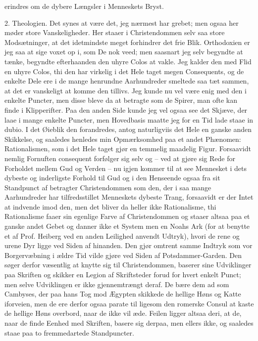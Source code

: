 \documentclass[12pt,a4paper]{article}
\begin{document}
erindres om de dybere Længsler i Menneskets Bryst.

2. Theologien. Det synes at være det, jeg nærmest har grebet; men ogsaa her møder store Vanskeligheder. Her staaer i Christendommen selv saa store Modsætninger, at det idetmindste meget forhindrer det frie Blik. Orthodoxien er jeg saa at sige voxet op i, som De nok veed; men saasnart jeg selv begyndte at tænke, begyndte efterhaanden den uhyre Colos at vakle. Jeg kalder den med Flid en uhyre Colos, thi den har virkelig i det Hele taget megen Consequents, og de enkelte Dele ere i de mange henrundne Aarhundreder smeltede saa tæt sammen, at det er vanskeligt at komme den tillivs. Jeg kunde nu vel være enig med den i enkelte Puncter, men disse bleve da at betragte som de Spirer, man ofte kan finde i Klipperifter. Paa den anden Side kunde jeg vel ogsaa see det Skjæve, der laae i mange enkelte Puncter, men Hovedbasis maatte jeg for en Tid lade staae in dubio. I det Øieblik den forandredes, antog naturligviis det Hele en ganske anden Skikkelse, og saaledes henledes min Opmærksomhed paa et andet Phænomen: Rationalismen, som i det Hele taget gjør en temmelig maadelig Figur. Forsaavidt nemlig Fornuften consequent forfølger sig selv og – ved at gjøre sig Rede for Forholdet mellem Gud og Verden – nu igjen kommer til at see Mennesket i dets dybeste og inderligste Forhold til Gud og i den Henseende ogsaa fra sit Standpunct af betragter Christendommen som den, der i saa mange Aarhundreder har tilfredsstillet Menneskets dybeste Trang, forsaavidt er der Intet at indvende imod den, men det bliver da heller ikke Rationalisme, thi Rationalisme faaer sin egenlige Farve af Christendommen og staaer altsaa paa et ganske andet Gebet og danner ikke et System men en Noahs Ark (for at benytte et af Prof. Heiberg ved en anden Leilighed anvendt Udtryk), hvori de rene og urene Dyr ligge ved Siden af hinanden. Den gjør omtrent samme Indtryk som vor Borgervæbning i ældre Tid vilde gjøre ved Siden af Potsdammer-Garden. Den søger derfor væsentlig at knytte sig til Christendommen, baserer sine Udviklinger paa Skriften og skikker en Legion af Skriftsteder forud for hvert enkelt Punct; men selve Udviklingen er ikke gjennemtrængt deraf. De bære dem ad som Cambyses, der paa hans Tog mod Ægypten skikkede de hellige Høns og Katte iforveien, men de ere derfor ogsaa parate til ligesom den romerske Consul at kaste de hellige Høns overbord, naar de ikke vil æde. Feilen ligger altsaa deri, at de, naar de finde Eenhed med Skriften, basere sig derpaa, men ellers ikke, og saaledes staae paa to fremmedartede Standpuncter.
\end{document}
